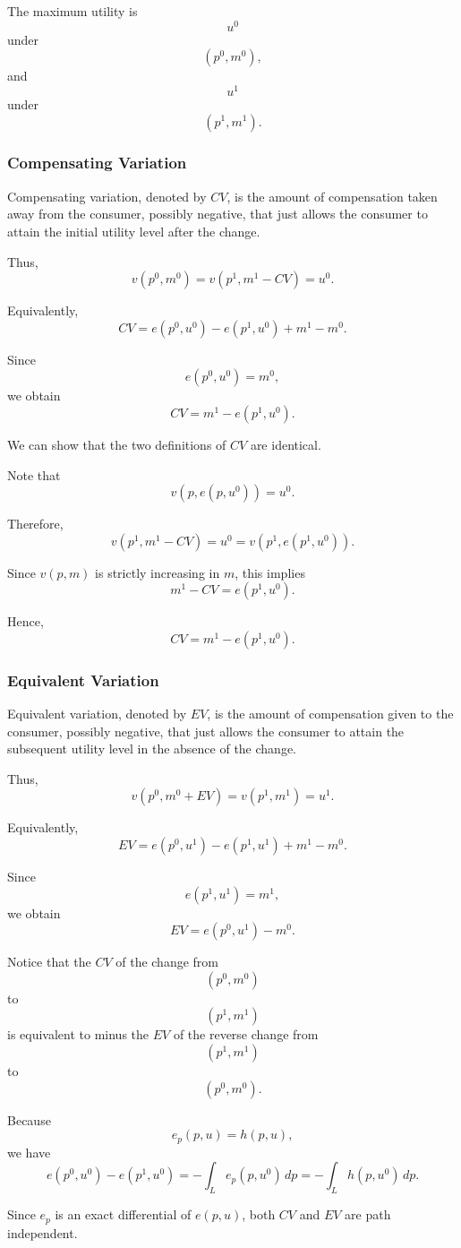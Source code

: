The maximum utility is
\[
u^0
\]
under
\[
(p^0,m^0),
\]
and
\[
u^1
\]
under
\[
(p^1,m^1).
\]

\subsubsection{Compensating Variation}

Compensating variation, denoted by \(CV\), is the amount of compensation taken away from the consumer, possibly negative, that just allows the consumer to attain the initial utility level after the change.

Thus,
\[
v(p^0,m^0)
=
v(p^1,m^1-CV)
=
u^0.
\]

Equivalently,
\[
CV
=
e(p^0,u^0)-e(p^1,u^0)+m^1-m^0.
\]

Since
\[
e(p^0,u^0)=m^0,
\]
we obtain
\[
CV
=
m^1-e(p^1,u^0).
\]

We can show that the two definitions of \(CV\) are identical.

Note that
\[
v(p,e(p,u^0))=u^0.
\]

Therefore,
\[
v(p^1,m^1-CV)
=
u^0
=
v(p^1,e(p^1,u^0)).
\]

Since \(v(p,m)\) is strictly increasing in \(m\), this implies
\[
m^1-CV=e(p^1,u^0).
\]

Hence,
\[
CV=m^1-e(p^1,u^0).
\]

\subsubsection{Equivalent Variation}

Equivalent variation, denoted by \(EV\), is the amount of compensation given to the consumer, possibly negative, that just allows the consumer to attain the subsequent utility level in the absence of the change.

Thus,
\[
v(p^0,m^0+EV)
=
v(p^1,m^1)
=
u^1.
\]

Equivalently,
\[
EV
=
e(p^0,u^1)-e(p^1,u^1)+m^1-m^0.
\]

Since
\[
e(p^1,u^1)=m^1,
\]
we obtain
\[
EV
=
e(p^0,u^1)-m^0.
\]

Notice that the \(CV\) of the change from
\[
(p^0,m^0)
\]
to
\[
(p^1,m^1)
\]
is equivalent to minus the \(EV\) of the reverse change from
\[
(p^1,m^1)
\]
to
\[
(p^0,m^0).
\]

Because
\[
e_p(p,u)=h(p,u),
\]
we have
\[
e(p^0,u^0)-e(p^1,u^0)
=
-\int_L e_p(p,u^0)\,dp
=
-\int_L h(p,u^0)\,dp.
\]

Since \(e_p\) is an exact differential of \(e(p,u)\), both \(CV\) and \(EV\) are path independent.


